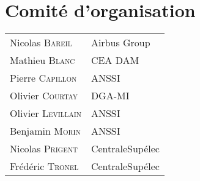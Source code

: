 
\section*{Comit\'e d'organisation}
\begin{tabular}{@{}p{5cm}@{}p{6.5cm}@{}}
  Nicolas  \textsc{Bareil}        & Airbus Group                                 \\
  Mathieu  \textsc{Blanc}         & CEA DAM                                      \\
  Pierre   \textsc{Capillon}      & ANSSI                                        \\
  Olivier  \textsc{Courtay}       & DGA-MI                                       \\
  Olivier  \textsc{Levillain}     & ANSSI                                        \\
  Benjamin \textsc{Morin}         & ANSSI                                        \\
  Nicolas  \textsc{Prigent}       & CentraleSup\'elec                            \\
  Fr\'ed\'eric  \textsc{Tronel}   & CentraleSup\'elec                            \\
\end{tabular}

